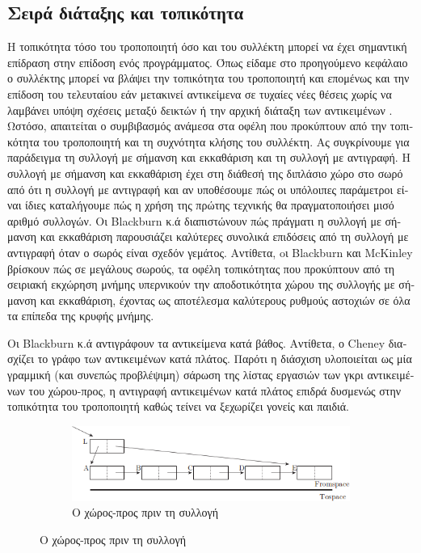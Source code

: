 \begin{greek}
\section{Σειρά διάταξης και τοπικότητα}
Η τοπικότητα τόσο του τροποποιητή όσο και του συλλέκτη μπορεί
να έχει σημαντική επίδραση στην επίδοση ενός προγράμματος. Όπως
είδαμε στο προηγούμενο κεφάλαιο ο συλλέκτης μπορεί να βλάψει
την τοπικότητα του τροποποιητή και επομένως και την επίδοση 
του τελευταίου εάν μετακινεί αντικείμενα σε τυχαίες νέες θέσεις 
χωρίς να λαμβάνει υπόψη σχέσεις μεταξύ δεικτών ή την αρχική 
διάταξη των αντικειμένων \cite{DBLP:conf/oopsla/AbuaiadhOPS04}. 
Ωστόσο, απαιτείται ο συμβιβασμός ανάμεσα στα οφέλη που προκύπτουν 
από την τοπικότητα του τροποποιητή και τη συχνότητα κλήσης του 
συλλέκτη. Ας συγκρίνουμε για παράδειγμα τη συλλογή με σήμανση 
και εκκαθάριση και τη συλλογή με αντιγραφή. Η συλλογή με σήμανση 
και εκκαθάριση έχει στη διάθεσή της διπλάσιο χώρο στο σωρό από 
ότι η συλλογή με αντιγραφή και αν υποθέσουμε πώς οι υπόλοιπες 
παράμετροι είναι ίδιες καταλήγουμε πώς η χρήση της πρώτης τεχνικής 
θα πραγματοποιήσει μισό αριθμό συλλογών. Οι Blackburn κ.ά \cite{DBLP:conf/icse/BlackburnCM04} διαπιστώνουν πώς πράγματι η
συλλογή με σήμανση και εκκαθάριση παρουσιάζει καλύτερες συνολικά
επιδόσεις από τη συλλογή με αντιγραφή όταν ο σωρός είναι σχεδόν
γεμάτος. Αντίθετα, oι Blackburn και McKinley \cite{DBLP:conf/oopsla/BlackburnM03} βρίσκουν πώς
σε μεγάλους σωρούς, τα οφέλη τοπικότητας που προκύπτουν από τη 
σειριακή εκχώρηση μνήμης υπερνικούν την αποδοτικότητα χώρου
της συλλογής με σήμανση και εκκαθάριση, έχοντας ως αποτέλεσμα
καλύτερους ρυθμούς αστοχιών σε όλα τα επίπεδα της κρυφής μνήμης.

Οι Blackburn κ.ά \cite{DBLP:conf/icse/BlackburnCM04} αντιγράφουν τα αντικείμενα κατά βάθος.
Αντίθετα, ο Cheney διασχίζει το γράφο των αντικειμένων κατά πλάτος. 
Παρότι η διάσχιση υλοποιείται ως μία γραμμική (και συνεπώς προβλέψιμη) 
σάρωση της λίστας εργασιών των γκρι αντικειμένων του χώρου-προς,
η αντιγραφή αντικειμένων κατά πλάτος επιδρά δυσμενώς στην τοπικότητα
του τροποποιητή καθώς τείνει να ξεχωρίζει γονείς και παιδιά.

\begin{figure}[H]
  \centering
  \begin{subfigure}{1.0\textwidth}
    \includegraphics{figures/cop_1a}
    \caption{Ο χώρος-προς πριν τη συλλογή}
  \end{subfigure}


\end{figure}
\end{greek}
